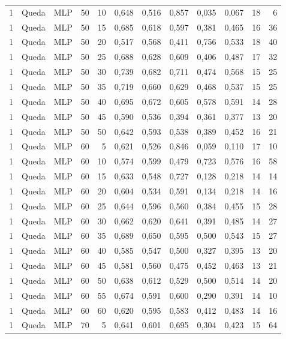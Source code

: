 \begin{longtable}{@{}rllrrrrrrrrr@{}}
1 & Queda & MLP & 50 & 10 & 0,648 & 0,516 & 0,857 & 0,035 & 0,067 & 18 & 6 \\
1 & Queda & MLP & 50 & 15 & 0,685 & 0,618 & 0,597 & 0,381 & 0,465 & 16 & 36 \\
1 & Queda & MLP & 50 & 20 & 0,517 & 0,568 & 0,411 & 0,756 & 0,533 & 18 & 40 \\
1 & Queda & MLP & 50 & 25 & 0,688 & 0,628 & 0,609 & 0,406 & 0,487 & 17 & 32 \\
1 & Queda & MLP & 50 & 30 & 0,739 & 0,682 & 0,711 & 0,474 & 0,568 & 15 & 25 \\
1 & Queda & MLP & 50 & 35 & 0,719 & 0,660 & 0,629 & 0,468 & 0,537 & 15 & 25 \\
1 & Queda & MLP & 50 & 40 & 0,695 & 0,672 & 0,605 & 0,578 & 0,591 & 14 & 28 \\
1 & Queda & MLP & 50 & 45 & 0,590 & 0,536 & 0,394 & 0,361 & 0,377 & 13 & 20 \\
1 & Queda & MLP & 50 & 50 & 0,642 & 0,593 & 0,538 & 0,389 & 0,452 & 16 & 21 \\
1 & Queda & MLP & 60 & 5 & 0,621 & 0,526 & 0,846 & 0,059 & 0,110 & 17 & 10 \\
1 & Queda & MLP & 60 & 10 & 0,574 & 0,599 & 0,479 & 0,723 & 0,576 & 16 & 58 \\
1 & Queda & MLP & 60 & 15 & 0,633 & 0,548 & 0,727 & 0,128 & 0,218 & 14 & 14 \\
1 & Queda & MLP & 60 & 20 & 0,604 & 0,534 & 0,591 & 0,134 & 0,218 & 14 & 16 \\
1 & Queda & MLP & 60 & 25 & 0,644 & 0,596 & 0,560 & 0,384 & 0,455 & 15 & 28 \\
1 & Queda & MLP & 60 & 30 & 0,662 & 0,620 & 0,641 & 0,391 & 0,485 & 14 & 27 \\
1 & Queda & MLP & 60 & 35 & 0,689 & 0,650 & 0,595 & 0,500 & 0,543 & 15 & 27 \\
1 & Queda & MLP & 60 & 40 & 0,585 & 0,547 & 0,500 & 0,327 & 0,395 & 13 & 20 \\
1 & Queda & MLP & 60 & 45 & 0,581 & 0,560 & 0,475 & 0,452 & 0,463 & 13 & 21 \\
1 & Queda & MLP & 60 & 50 & 0,638 & 0,612 & 0,529 & 0,500 & 0,514 & 14 & 20 \\
1 & Queda & MLP & 60 & 55 & 0,674 & 0,591 & 0,600 & 0,290 & 0,391 & 14 & 10 \\
1 & Queda & MLP & 60 & 60 & 0,620 & 0,595 & 0,583 & 0,412 & 0,483 & 14 & 16 \\
1 & Queda & MLP & 70 & 5 & 0,641 & 0,601 & 0,695 & 0,304 & 0,423 & 15 & 64 \\

\end{longtable}
